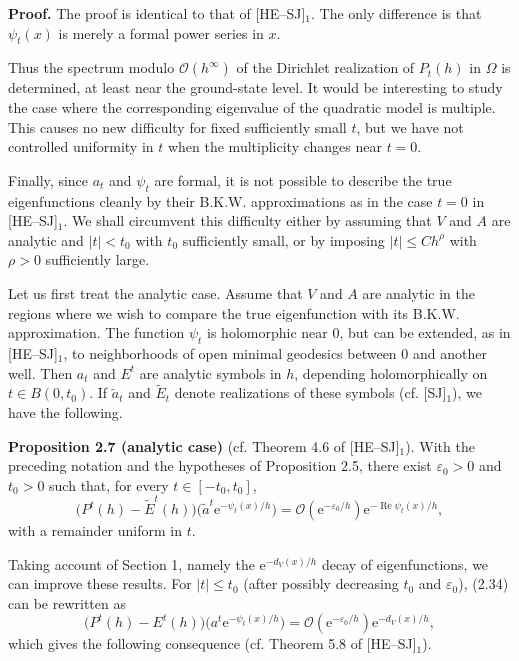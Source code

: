 \documentclass[11pt]{article}
\newcommand{\Ree}{\operatorname{Re}}
\newcommand{\OO}{\mathcal O}
\newcommand{\e}{\mathrm{e}}
\begin{document}
\noindent\textbf{Proof.}
The proof is identical to that of [HE--SJ]$_1$. The only difference is that $\psi_t(x)$ is merely a formal power series in $x$.

Thus the spectrum modulo $\OO(h^\infty)$ of the Dirichlet realization of $P_t(h)$ in $\Omega$ is determined, at least near the ground-state level.
It would be interesting to study the case where the corresponding eigenvalue of the quadratic model is multiple. This causes no new difficulty for fixed sufficiently small $t$, but we have not controlled uniformity in $t$ when the multiplicity changes near $t=0$.

Finally, since $a_t$ and $\psi_t$ are formal, it is not possible to describe the true eigenfunctions cleanly by their B.K.W. approximations as in the case $t=0$ in [HE--SJ]$_1$. We shall circumvent this difficulty either by assuming that $V$ and $A$ are analytic and $|t|<t_0$ with $t_0$ sufficiently small, or by imposing $|t|\le Ch^\rho$ with $\rho>0$ sufficiently large.

Let us first treat the analytic case. Assume that $V$ and $A$ are analytic in the regions where we wish to compare the true eigenfunction with its B.K.W. approximation. The function $\psi_t$ is holomorphic near $0$, but can be extended, as in [HE--SJ]$_1$, to neighborhoods of open minimal geodesics between $0$ and another well.
Then $a_t$ and $E^t$ are analytic symbols in $h$, depending holomorphically on $t\in B(0,t_0)$. If $\widetilde a_t$ and $\widetilde E_t$ denote realizations of these symbols (cf. [SJ]$_1$), we have the following.

\medskip
\noindent\textbf{Proposition 2.7 (analytic case)} (cf. Theorem 4.6 of [HE--SJ]$_1$).
With the preceding notation and the hypotheses of Proposition 2.5, there exist $\varepsilon_0>0$ and $t_0>0$ such that, for every $t\in[-t_0,t_0]$,
\begin{equation}
\bigl(P^t(h)-\widetilde E^t(h)\bigr)
\bigl(\widetilde a^t\e^{-\psi_t(x)/h}\bigr)
=\OO(\e^{-\varepsilon_0/h})\e^{-\Ree\psi_t(x)/h},
\tag{2.34}
\end{equation}
with a remainder uniform in $t$.

Taking account of Section 1, namely the $\e^{-d_V(x)/h}$ decay of eigenfunctions, we can improve these results. For $|t|\le t_0$ (after possibly decreasing $t_0$ and $\varepsilon_0$), (2.34) can be rewritten as
\begin{equation}
\bigl(P^t(h)-E^t(h)\bigr)
\bigl(a^t\e^{-\psi_t(x)/h}\bigr)
=\OO(\e^{-\varepsilon_0/h})\e^{-d_V(x)/h},
\tag{2.35}
\end{equation}
which gives the following consequence (cf. Theorem 5.8 of [HE--SJ]$_1$).
\end{document}
